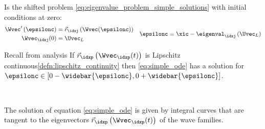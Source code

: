 \begin{defnbox}\nospacing
    \begin{defn}\label{defn:simple_ode}
        Is the shifted problem \cref{eq:eigenvalue_problem_simple_solutions} with initial conditions at zero:
        \begin{align}
          \begin{aligned}
            \Wvec'\left(\epsilonc\right)&=\vec{r}_{\idxj}\left(\Wvec(\epsilonc)\right) \\
            \Wvec_{\idxj}(0)&=\Uvec_{L}
          \end{aligned}&&\epsilonc=\xic-\eigenval_{\idxj}\left(\Uvec_{L}\right)\label{eq:simple_ode}
        \end{align}
    \end{defn}
\end{defnbox}
\begin{notebox}\nospacing
    Recall from analysis If $\vec{r}_{\idxp}\left(\Wvec_{\idxp}(t)\right)$ is Lipschitz continuous\cref{defn:lipschitz_continuity} then
    \cref{eq:simple_ode} has a solution for $\epsilonc\in \left[0-\widebar{\epsilonc},0+\widebar{\epsilonc}\right]$.
\end{notebox}
\begin{explanationbox}\nospacing
    \begin{explanation}\leavevmode\\
        \begin{minipage}[c]{0.45\textwidth}
            The solution of equation \cref{eq:simple_ode} is given by integral curves that are tangent to the eigenvectors
            $\vec{r}_{\idxp}\left(\Wvec_{\idxp}(t)\right)$ of the wave families.
        \end{minipage}
        \begin{minipage}{0.5\textwidth}
            \begin{figure}[H]
                \centering{
                  \def\svgwidth{120pt}
                  \resizebox{\linewidth}{!}{}
                }
            \end{figure}
        \end{minipage}
    \end{explanation}
\end{explanationbox}
